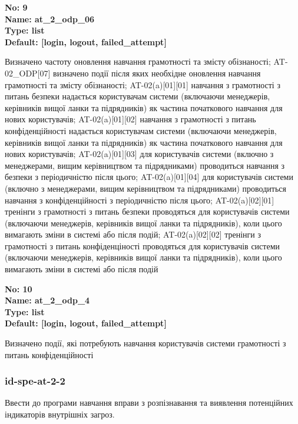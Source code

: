 \documentclass{article}
\begin{document}
{\footnotesize\bfseries
No: 9\\
Name: at\_\allowbreak{}2\_\allowbreak{}odp\_\allowbreak{}06\\
Type: list\\
Default: [\textquotedbl{}login\textquotedbl{}, \textquotedbl{}logout\textquotedbl{}, \textquotedbl{}failed\_\allowbreak{}attempt\textquotedbl{}]
}

{\footnotesize Визначено частоту оновлення навчання грамотності та змісту обізнаності; AT-02\_\allowbreak{}ODP[07] визначено події після яких необхідне оновлення навчання грамотності та змісту обізнаності; AT-02(a)[01][01] навчання з грамотності з питань безпеки надається користувачам системи (включаючи менеджерів, керівників вищої ланки та підрядників) як частина початкового навчання для нових користувачів; AT-02(a)[01][02] навчання з грамотності з питань конфіденційності надається користувачам системи (включаючи менеджерів, керівників вищої ланки та підрядників) як частина початкового навчання для нових користувачів; AT-02(a)[01][03] для користувачів системи (включно з менеджерами, вищим керівництвом та підрядниками) проводиться навчання з безпеки з періодичністю після цього; AT-02(a)[01][04] для користувачів системи (включно з менеджерами, вищим керівництвом та підрядниками) проводиться навчання з конфіденційності з періодичністю після цього; AT-02(a)[02][01] тренінги з грамотності з питань безпеки проводяться для користувачів системи (включаючи менеджерів, керівників вищої ланки та підрядників), коли цього вимагають зміни в системі або після подій; AT-02(a)[02][02] тренінги з грамотності з питань конфіденціності проводяться для користувачів системи (включаючи менеджерів, керівників вищої ланки та підрядників), коли цього вимагають зміни в системі або після подій}


{\footnotesize\bfseries
No: 10\\
Name: at\_\allowbreak{}2\_\allowbreak{}odp\_\allowbreak{}4\\
Type: list\\
Default: [\textquotedbl{}login\textquotedbl{}, \textquotedbl{}logout\textquotedbl{}, \textquotedbl{}failed\_\allowbreak{}attempt\textquotedbl{}]
}

{\footnotesize Визначено події, які потребують навчання користувачів системи грамотності з питань конфіденційності}




\subsubsection{id-spe-at-2-2}
Ввести до програми навчання вправи з розпізнавання та виявлення потенційних індикаторів внутрішніх загроз.
\end{document}
